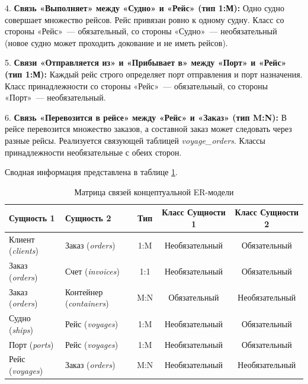 \documentclass[a4paper,14pt]{article}
\begin{document}
4. \textbf{Связь «Выполняет» между «Судно» и «Рейс» (тип 1:М):}
Одно судно совершает множество рейсов. Рейс привязан ровно к одному судну. Класс со стороны «Рейс»~--- обязательный, со стороны «Судно»~--- необязательный (новое судно может проходить докование и не иметь рейсов).

5. \textbf{Связи «Отправляется из» и «Прибывает в» между «Порт» и «Рейс» (тип 1:М):}
Каждый рейс строго определяет порт отправления и порт назначения. Класс принадлежности со стороны «Рейс»~--- обязательный, со стороны «Порт»~--- необязательный.

6. \textbf{Связь «Перевозится в рейсе» между «Рейс» и «Заказ» (тип M:N):}
В рейсе перевозится множество заказов, а составной заказ может следовать через разные рейсы. Реализуется связующей таблицей \textit{voyage\_orders}. Классы принадлежности необязательные с обеих сторон.

Сводная информация представлена в таблице \ref{tab:relations}.

\begin{table}[h!]
    \caption{Матрица связей концептуальной ER-модели}
    \label{tab:relations}
    \small
    \begin{tabularx}{\textwidth}{|X|X|c|c|c|}
        \hline
        \textbf{Сущность 1}       & \textbf{Сущность 2}             & \textbf{Тип} & \textbf{Класс Сущности 1} & \textbf{Класс Сущности 2} \\ \hline
        Клиент (\textit{clients}) & Заказ (\textit{orders})         & 1:M          & Необязательный            & Обязательный              \\ \hline
        Заказ (\textit{orders})   & Счет (\textit{invoices})        & 1:1          & Необязательный            & Обязательный              \\ \hline
        Заказ (\textit{orders})   & Контейнер (\textit{containers}) & M:N          & Обязательный              & Необязательный            \\ \hline
        Судно (\textit{ships})    & Рейс (\textit{voyages})         & 1:M          & Необязательный            & Обязательный              \\ \hline
        Порт (\textit{ports})     & Рейс (\textit{voyages})         & 1:M          & Необязательный            & Обязательный              \\ \hline
        Рейс (\textit{voyages})   & Заказ (\textit{orders})         & M:N          & Необязательный            & Необязательный            \\ \hline
    \end{tabularx}
\end{table}
\end{document}
